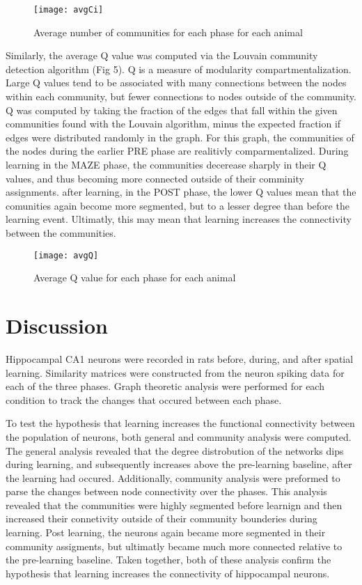 \documentclass[9pt,twocolumn,twoside,lineno]{pnas-new}
\begin{document}
\begin{figure}[tbhp]
\centering
\texttt{[image: avgCi]}
\caption{Average number of communities for each phase for each animal}
\label{fig:avgCi}
\end{figure}

Similarly, the average Q value was computed via the Louvain community detection algorithm (Fig 5). Q is a measure of modularity compartmentalization. Large Q values tend to be associated with many connections between the nodes within each community, but fewer connections to nodes outside of the community. Q was computed by taking the fraction of the edges that fall within the given communities found with the Louvain algorithm, minus the expected fraction if edges were distributed randomly in the graph. For this graph, the communities of the nodes during the earlier PRE phase are  realitivly comparmentalized. During learning in the MAZE phase, the communities decerease sharply in their Q values, and thus becoming more connected outside of their comminity assignments. after learning, in the POST phase, the lower Q values mean that the comunities again become more segmented, but to a lesser degree than before the learning event. Ultimatly, this may mean that learning increases the connectivity between the communities. 

\begin{figure}[tbhp]
\centering
\texttt{[image: avgQ]}
\caption{Average Q value for each phase for each animal}
\label{fig:avgQ}
\end{figure}


\section*{Discussion}
Hippocampal CA1 neurons were recorded in rats before, during, and after spatial learning. Similarity matrices were constructed from the neuron spiking data for each of the three phases. Graph theoretic analysis were performed for each condition to track the changes that occured between each phase. 

To test the hypothesis that learning increases the functional connectivity between the population of neurons, both general and community analysis were computed. The general analysis revealed that the degree distrobution of the networks dips during learning, and subsequently increases above the pre-learning baseline, after the learning had occured. Additionally, community analysis were preformed to parse the changes between node connectivity over the phases. This analysis revealed that the communities were highly segmented before learnign and then increased their connetivity outside of their community bounderies during learning. Post learning, the neurons again became more segmented in their community assigments, but ultimatly became much more connected relative to the pre-learning baseline. Taken together, both of these analysis confirm the  hypothesis that learning increases the connectivity of hippocampal neurons. 
\end{document}
